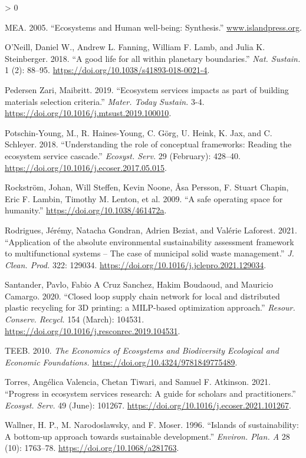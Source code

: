 \documentclass[
]{article}
\newlength{\cslhangindent}
\newenvironment{CSLReferences}[2] %
 {%
  \setlength{\parindent}{0pt}
  \ifodd #1 \everypar{\setlength{\hangindent}{\cslhangindent}}\ignorespaces\fi
  \ifnum #2 > 0
  \setlength{\parskip}{#2\baselineskip}
  \fi
 }%
 {}
\begin{document}
\begin{CSLReferences}{1}{0}
\leavevmode\hypertarget{ref-MEA2005}{}%
MEA. 2005. {``{Ecosystems and Human well-being: Synthesis}.''} \href{https://www.islandpress.org}{www.islandpress.org}.

\leavevmode\hypertarget{ref-ONeill2018}{}%
O'Neill, Daniel W., Andrew L. Fanning, William F. Lamb, and Julia K. Steinberger. 2018. {``{A good life for all within planetary boundaries}.''} \emph{Nat. Sustain.} 1 (2): 88--95. \url{https://doi.org/10.1038/s41893-018-0021-4}.

\leavevmode\hypertarget{ref-PedersenZari2019}{}%
Pedersen Zari, Maibritt. 2019. {``{Ecosystem services impacts as part of building materials selection criteria}.''} \emph{Mater. Today Sustain.} 3-4. \url{https://doi.org/10.1016/j.mtsust.2019.100010}.

\leavevmode\hypertarget{ref-Potschin-Young2018}{}%
Potschin-Young, M., R. Haines-Young, C. Görg, U. Heink, K. Jax, and C. Schleyer. 2018. {``{Understanding the role of conceptual frameworks: Reading the ecosystem service cascade}.''} \emph{Ecosyst. Serv.} 29 (February): 428--40. \url{https://doi.org/10.1016/j.ecoser.2017.05.015}.

\leavevmode\hypertarget{ref-Rockstrom2009}{}%
Rockström, Johan, Will Steffen, Kevin Noone, Åsa Persson, F. Stuart Chapin, Eric F. Lambin, Timothy M. Lenton, et al. 2009. {``{A safe operating space for humanity}.''} \url{https://doi.org/10.1038/461472a}.

\leavevmode\hypertarget{ref-Rodrigues2021}{}%
Rodrigues, Jérémy, Natacha Gondran, Adrien Beziat, and Valérie Laforest. 2021. {``{Application of the absolute environmental sustainability assessment framework to multifunctional systems -- The case of municipal solid waste management}.''} \emph{J. Clean. Prod.} 322: 129034. \url{https://doi.org/10.1016/j.jclepro.2021.129034}.

\leavevmode\hypertarget{ref-Santander2020}{}%
Santander, Pavlo, Fabio A Cruz Sanchez, Hakim Boudaoud, and Mauricio Camargo. 2020. {``{Closed loop supply chain network for local and distributed plastic recycling for 3D printing: a MILP-based optimization approach}.''} \emph{Resour. Conserv. Recycl.} 154 (March): 104531. \url{https://doi.org/10.1016/j.resconrec.2019.104531}.

\leavevmode\hypertarget{ref-TEEB2010}{}%
TEEB. 2010. \emph{{The Economics of Ecosystems and Biodiversity Ecological and Economic Foundations.}} \url{https://doi.org/10.4324/9781849775489}.

\leavevmode\hypertarget{ref-Torres2021}{}%
Torres, Angélica Valencia, Chetan Tiwari, and Samuel F. Atkinson. 2021. {``{Progress in ecosystem services research: A guide for scholars and practitioners}.''} \emph{Ecosyst. Serv.} 49 (June): 101267. \url{https://doi.org/10.1016/j.ecoser.2021.101267}.

\leavevmode\hypertarget{ref-Wallner1996}{}%
Wallner, H. P., M. Narodoslawsky, and F. Moser. 1996. {``{Islands of sustainability: A bottom-up approach towards sustainable development}.''} \emph{Environ. Plan. A} 28 (10): 1763--78. \url{https://doi.org/10.1068/a281763}.

\end{CSLReferences}
\end{document}

